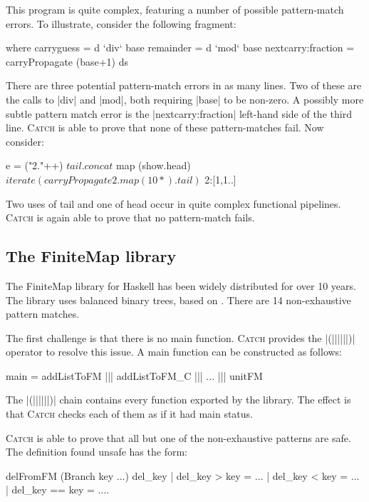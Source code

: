 \documentclass[preprint]{sigplanconf}
\newcommand{\C}[1]{\textsf{#1}}
\newcommand{\catch}{\textsc{Catch}}
\begin{document}
This program is quite complex, featuring a number of possible pattern-match errors. To illustrate, consider the following fragment:

\begin{code}
  where  carryguess = d `div` base
         remainder = d `mod` base
         nextcarry:fraction = carryPropagate (base+1) ds
\end{code}

\noindent There are three potential pattern-match errors in as many lines. Two of these are the calls to |div| and |mod|, both requiring |base| to be non-zero. A possibly more subtle pattern match error is the |nextcarry:fraction| left-hand side of the third line. \catch{} is able to prove that none of these pattern-matches fail. Now consider:

\begin{code}
e =  ("2."++) $
     tail . concat $
     map (show.head) $
     iterate (carryPropagate 2 . map (10*) . tail) $
     2:[1,1..]
\end{code}

\noindent Two uses of \C{tail} and one of \C{head} occur in quite complex functional pipelines. \catch{} is again able to prove that no pattern-match fails.

\subsection{The FiniteMap library}
\label{sec:finitemap}

The FiniteMap library for Haskell has been widely distributed for over 10 years. The library uses balanced binary trees, based on \citep{adams:sets}. There are 14 non-exhaustive pattern matches.

The first challenge is that there is no \C{main} function. \catch{} provides the |(||||||)| operator to resolve this issue. A \C{main} function can be constructed as follows:

\begin{code}
main = addListToFM ||| addListToFM_C ||| ... ||| unitFM
\end{code}

The |(||||||)| chain contains every function exported by the library. The effect is that \catch{} checks each of them as if it had \C{main} status.

\catch{} is able to prove that all but one of the non-exhaustive patterns are safe. The definition found unsafe has the form:

\begin{code}
delFromFM (Branch key ...) del_key  | del_key  >   key = ...
                                    | del_key  <   key = ...
                                    | del_key  ==  key = ....
\end{code}
\end{document}
